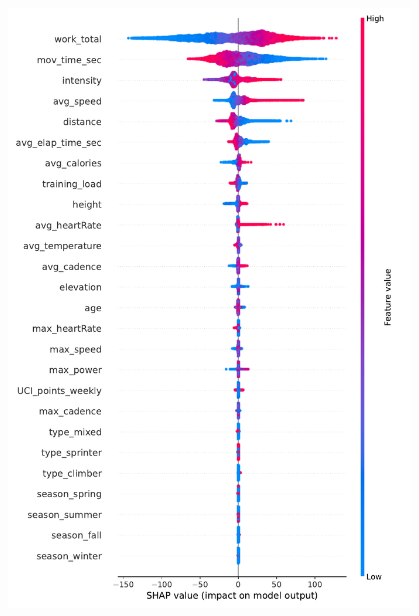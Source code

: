 \documentclass[12pt,a4paper]{article}
\let\origfigure\figure
\let\endorigfigure\endfigure
\renewenvironment{figure}[1][2] {
    \expandafter\origfigure\expandafter[H]
} {
    \endorigfigure
}
\begin{document}
\begin{figure}
\centering
\hspace{-3cm}\includegraphics[width=0.8\textwidth]{./includes/shap/xgboost/summary_avg_p.pdf}
    \caption{This figure shows the summary of each variable with respect to each observation of model 3 fitted with the Catboost algorithm. All values were calculated from the test dataset. }
    \label{fig:summary_avg_p}
\end{figure}
\end{document}
